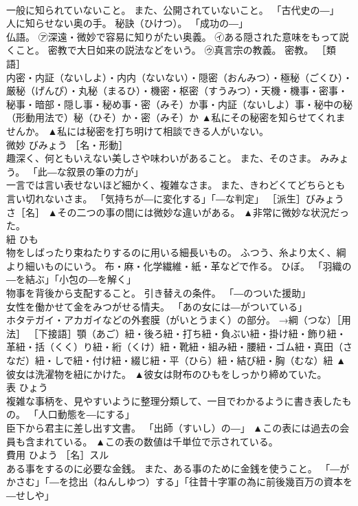 \documentclass[8pt]{extreport}
\begin{document}
\begin{CJK}{UTF8}{min}
\\	一般に知られていないこと。 また、公開されていないこと。 「古代史の―」 
\\	人に知らせない奥の手。 秘訣（ひけつ）。 「成功の―」 
\\	仏語。 ㋐深遠・微妙で容易に知りがたい奥義。 ㋑ある隠された意味をもって説くこと。 密教で大日如来の説法などをいう。 ㋒真言宗の教義。 密教。 ［類語］
\\	内密・内証（ないしよ）・内内（ないない）・隠密（おんみつ）・極秘（ごくひ）・厳秘（げんぴ）・丸秘（まるひ）・機密・枢密（すうみつ）・天機・機事・密事・秘事・暗部・隠し事・秘め事・密（みそ）か事・内証（ないしよ）事・秘中の秘　（形動用法で）秘（ひそ）か・密（みそ）か	▲私にその秘密を知らせてくれませんか。 ▲私には秘密を打ち明けて相談できる人がいない。
\\	微妙	びみょう	［名・形動］ 
\\	趣深く、何ともいえない美しさや味わいがあること。 また、そのさま。 みみょう。 「此―な叙景の筆の力が」 
\\	一言では言い表せないほど細かく、複雑なさま。 また、きわどくてどちらとも言い切れないさま。 「気持ちが―に変化する」「―な判定」 ［派生］びみょうさ［名］	▲その二つの事の間には微妙な違いがある。 ▲非常に微妙な状況だった。
\\	紐	ひも	
\\	物をしばったり束ねたりするのに用いる細長いもの。 ふつう、糸より太く、綱より細いものにいう。 布・麻・化学繊維・紙・革などで作る。 ひぼ。 「羽織の―を結ぶ」「小包の―を解く」 
\\	物事を背後から支配すること。 引き替えの条件。 「―のついた援助」 
\\	女性を働かせて金をみつがせる情夫。 「あの女には―がついている」 
\\	ホタテガイ・アカガイなどの外套膜（がいとうまく）の部分。 →綱（つな）［用法］ ［下接語］顎（あご）紐・後ろ紐・打ち紐・負ぶい紐・掛け紐・飾り紐・革紐・括（くく）り紐・絎（くけ）紐・靴紐・組み紐・腰紐・ゴム紐・真田（さなだ）紐・しで紐・付け紐・綴じ紐・平（ひら）紐・結び紐・胸（むな）紐	▲彼女は洗濯物を紐にかけた。 ▲彼女は財布のひもをしっかり締めていた。
\\	表	ひょう	
\\	複雑な事柄を、見やすいように整理分類して、一目でわかるように書き表したもの。 「人口動態を―にする」 
\\	臣下から君主に差し出す文書。 「出師（すいし）の―」	▲この表には過去の会員も含まれている。 ▲この表の数値は千単位で示されている。
\\	費用	ひよう	［名］スル 
\\	ある事をするのに必要な金銭。 また、ある事のために金銭を使うこと。 「―がかさむ」「―を捻出（ねんしゆつ）する」「往昔十字軍の為に前後幾百万の資本を―せしや」 

\end{CJK}
\end{document}
